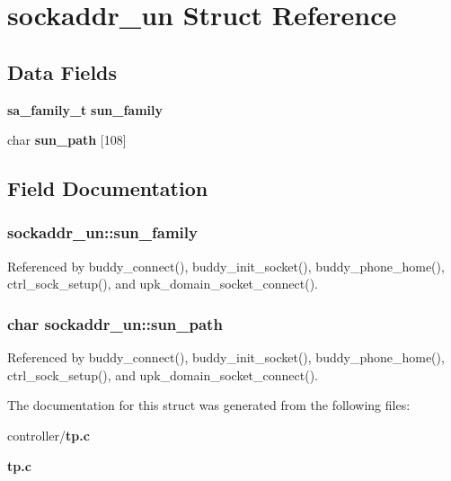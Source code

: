 \section{sockaddr\_\-un Struct Reference}
\label{structsockaddr__un}
\subsection*{Data Fields}
\begin{DoxyCompactItemize}
\item 
{\bf sa\_\-family\_\-t} {\bf sun\_\-family}
\item 
char {\bf sun\_\-path} [108]
\end{DoxyCompactItemize}


\subsection{Field Documentation}
\subsubsection[{sun\_\-family}]{ {\bf sockaddr\_\-un::sun\_\-family}}\label{structsockaddr__un_a129696980f9f8823979bb3e5e7e3c85a}


Referenced by buddy\_\-connect(), buddy\_\-init\_\-socket(), buddy\_\-phone\_\-home(), ctrl\_\-sock\_\-setup(), and upk\_\-domain\_\-socket\_\-connect().

\subsubsection[{sun\_\-path}]{\setlength{\rightskip}{0pt plus 5cm}char {\bf sockaddr\_\-un::sun\_\-path}}\label{structsockaddr__un_a342822ce201ec8af97fb53fe7f8afe00}


Referenced by buddy\_\-connect(), buddy\_\-init\_\-socket(), buddy\_\-phone\_\-home(), ctrl\_\-sock\_\-setup(), and upk\_\-domain\_\-socket\_\-connect().



The documentation for this struct was generated from the following files:\begin{DoxyCompactItemize}
\item 
controller/{\bf tp.c}\item 
{\bf tp.c}\end{DoxyCompactItemize}

